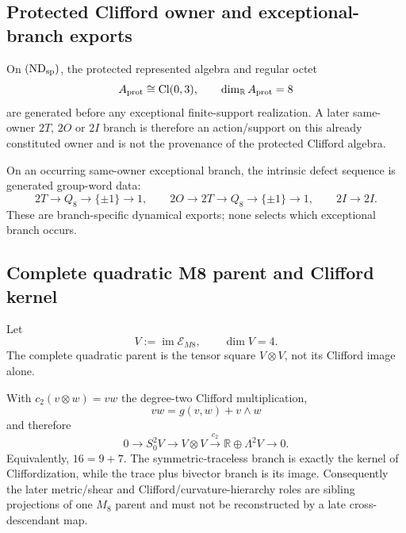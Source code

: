 \documentclass[12pt,a4paper]{article}
\begin{document}
\subsection{Protected Clifford owner and exceptional-branch exports}
\label{p3b:sec:v236-exceptional-independence}
\begin{proposition}
\label{p3b:prop:v236-protected-octet-independent}
On \((\mathrm{ND}_{\rm sp})\), the protected represented algebra and regular
octet
\[
 A_{\rm prot}\cong\operatorname{Cl}(0,3),\qquad \dim_{\mathbb R}A_{\rm prot}=8
\]
are generated before any exceptional finite-support realization.  A later
same-owner \(2T\), \(2O\) or \(2I\) branch is therefore an action/support on
this already constituted owner and is not the provenance of the protected
Clifford algebra.
\end{proposition}
\begin{corollary}
\label{p3b:cor:v236-exceptional-commutator-exports}
On an occurring same-owner exceptional branch, the intrinsic defect sequence
is generated group-word data:
\[
 2T\to Q_8\to\{\pm1\}\to1,\qquad
 2O\to2T\to Q_8\to\{\pm1\}\to1,\qquad
 2I\to2I.
\]
These are branch-specific dynamical exports; none selects which exceptional
branch occurs.
\end{corollary}


\subsection{Complete quadratic M8 parent and Clifford kernel}
\label{p3b:sec:v189-complete-quadratic-parent}
Let
\[
 V:=\operatorname{im}\mathcal E_{M8},\qquad \dim V=4.
\]
The complete quadratic parent is the tensor square $V\otimes V$, not its
Clifford image alone.

\begin{theorem}
\label{p3b:thm:v189-quadratic-sibling-exact-sequence}
With $c_2(v\otimes w)=vw$ the degree-two Clifford multiplication,
\[
 vw=g(v,w)+v\wedge w
\]
and therefore
\[
 \boxed{0\longrightarrow S^2_0V
 \longrightarrow V\otimes V
 \xrightarrow{\ c_2\ }
 \mathbb R\oplus\Lambda^2V
 \longrightarrow0.}
\]
Equivalently, $16=9+7$.  The symmetric-traceless branch is exactly the kernel
of Cliffordization, while the trace plus bivector branch is its image.
Consequently the later metric/shear and Clifford/curvature-hierarchy roles are
sibling projections of one $M_8$ parent and must not be reconstructed by a
late cross-descendant map.
\end{theorem}
\end{document}
